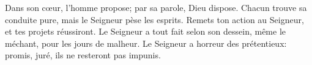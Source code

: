 Dans son cœur, l’homme propose;
	par sa parole, Dieu dispose.
Chacun trouve sa conduite pure, mais le Seigneur pèse les esprits.
	Remets ton action au Seigneur, et tes projets réussiront.
Le Seigneur a tout fait selon son dessein,
	même le méchant, pour les jours de malheur.
Le Seigneur a horreur des prétentieux:
	promis, juré, ils ne resteront pas impunis.
